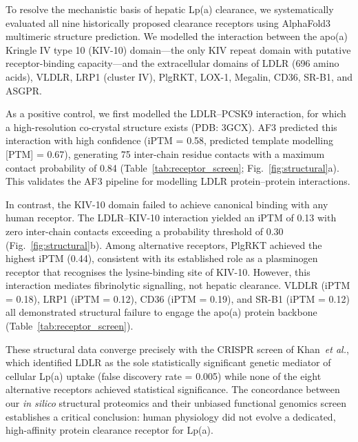 \documentclass[11pt,a4paper]{article}
\newcommand{\lpa}{Lp(a)}
\newcommand{\pcsk}{PCSK9}
\newcommand{\iptm}{iPTM}
\newcommand{\kiv}{KIV-10}
\begin{document}
To resolve the mechanistic basis of hepatic \lpa{} clearance, we systematically evaluated all nine historically proposed clearance receptors using AlphaFold3 multimeric structure prediction. We modelled the interaction between the apo(a) Kringle IV type 10 (\kiv{}) domain---the only KIV repeat domain with putative receptor-binding capacity\cite{sharma2017}---and the extracellular domains of LDLR (696 amino acids), VLDLR, LRP1 (cluster IV), PlgRKT, LOX-1, Megalin, CD36, SR-B1, and ASGPR.

As a positive control, we first modelled the LDLR--\pcsk{} interaction, for which a high-resolution co-crystal structure exists (PDB: 3GCX)\cite{kwon2008}. AF3 predicted this interaction with high confidence (\iptm{} = 0.58, predicted template modelling [PTM] = 0.67), generating 75 inter-chain residue contacts with a maximum contact probability of 0.84 (Table~\ref{tab:receptor_screen}; Fig.~\ref{fig:structural}a). This validates the AF3 pipeline for modelling LDLR protein--protein interactions.

In contrast, the \kiv{} domain failed to achieve canonical binding with any human receptor. The LDLR--\kiv{} interaction yielded an \iptm{} of 0.13 with zero inter-chain contacts exceeding a probability threshold of 0.30 (Fig.~\ref{fig:structural}b). Among alternative receptors, PlgRKT achieved the highest \iptm{} (0.44), consistent with its established role as a plasminogen receptor that recognises the lysine-binding site of KIV-10\cite{miles2021}. However, this interaction mediates fibrinolytic signalling, not hepatic clearance. VLDLR (\iptm{} = 0.18), LRP1 (\iptm{} = 0.12), CD36 (\iptm{} = 0.19), and SR-B1 (\iptm{} = 0.12) all demonstrated structural failure to engage the apo(a) protein backbone (Table~\ref{tab:receptor_screen}).

These structural data converge precisely with the CRISPR screen of Khan~\textit{et al.}\cite{khan2025}, which identified LDLR as the sole statistically significant genetic mediator of cellular \lpa{} uptake (false discovery rate = 0.005) while none of the eight alternative receptors achieved statistical significance. The concordance between our \textit{in silico} structural proteomics and their unbiased functional genomics screen establishes a critical conclusion: human physiology did not evolve a dedicated, high-affinity protein clearance receptor for \lpa{}.
\end{document}
